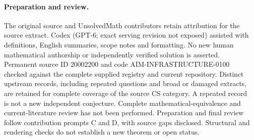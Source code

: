 \documentclass[11pt]{article}
\begin{document}
\paragraph{Preparation and review.}
The original source and UnsolvedMath contributors retain attribution for the source extract. Codex (GPT-6; exact serving revision not exposed) assisted with definitions, English summaries, scope notes and formatting. No new human mathematical authorship or independently verified solution is asserted. Permanent source ID 20002200 and code AIM-INFRASTRUCTURE-0100 checked against the complete supplied registry and current repository. Distinct upstream records, including repeated questions and broad or damaged extracts, are retained for complete coverage of the source CS category. A repeated record is not a new independent conjecture. Complete mathematical-equivalence and current-literature review has not been performed. Preparation and final review follow contribution prompts C and D, with source gaps disclosed. Structural and rendering checks do not establish a new theorem or open status.
\label{end:20002200}
\end{document}

